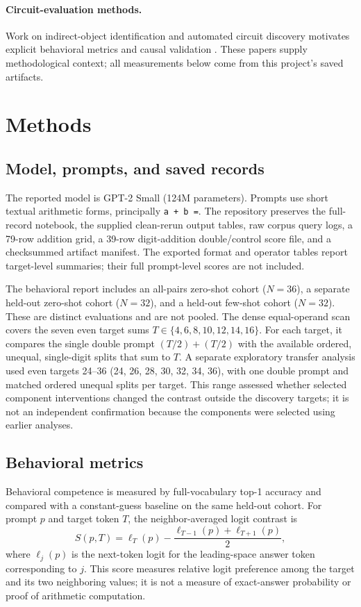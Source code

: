 \documentclass[11pt]{article}
\begin{document}
\paragraph{Circuit-evaluation methods.} Work on indirect-object identification and automated circuit discovery motivates explicit behavioral metrics and causal validation \cite{wang2023ioi,conmy2023acdc}. These papers supply methodological context; all measurements below come from this project's saved artifacts.

\section{Methods}

\subsection{Model, prompts, and saved records}

The reported model is GPT-2 Small (124M parameters). Prompts use short textual arithmetic forms, principally \texttt{a + b =}. The repository preserves the full-record notebook, the supplied clean-rerun output tables, raw corpus query logs, a 79-row addition grid, a 39-row digit-addition double/control score file, and a checksummed artifact manifest. The exported format and operator tables report target-level summaries; their full prompt-level scores are not included.

The behavioral report includes an all-pairs zero-shot cohort ($N=36$), a separate held-out zero-shot cohort ($N=32$), and a held-out few-shot cohort ($N=32$). These are distinct evaluations and are not pooled. The dense equal-operand scan covers the seven even target sums $T\in\{4,6,8,10,12,14,16\}$. For each target, it compares the single double prompt $(T/2)+(T/2)$ with the available ordered, unequal, single-digit splits that sum to $T$. A separate exploratory transfer analysis used even targets 24--36 (24, 26, 28, 30, 32, 34, 36), with one double prompt and matched ordered unequal splits per target. This range assessed whether selected component interventions changed the contrast outside the discovery targets; it is not an independent confirmation because the components were selected using earlier analyses.

\subsection{Behavioral metrics}

Behavioral competence is measured by full-vocabulary top-1 accuracy and compared with a constant-guess baseline on the same held-out cohort. For prompt $p$ and target token $T$, the neighbor-averaged logit contrast is
\begin{equation}
S(p,T)=\ell_T(p)-\frac{\ell_{T-1}(p)+\ell_{T+1}(p)}{2},
\label{eq:score}
\end{equation}
where $\ell_j(p)$ is the next-token logit for the leading-space answer token corresponding to $j$. This score measures relative logit preference among the target and its two neighboring values; it is not a measure of exact-answer probability or proof of arithmetic computation.
\end{document}
